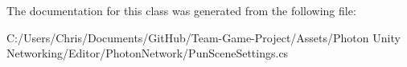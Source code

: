 The documentation for this class was generated from the following file\+:\begin{DoxyCompactItemize}
\item 
C\+:/\+Users/\+Chris/\+Documents/\+Git\+Hub/\+Team-\/\+Game-\/\+Project/\+Assets/\+Photon Unity Networking/\+Editor/\+Photon\+Network/Pun\+Scene\+Settings.\+cs\end{DoxyCompactItemize}
